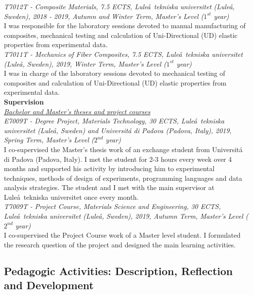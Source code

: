 \documentclass[
  a4paper, 
]{fortysecondscv}
\begin{document}
\textit{T7012T - Composite Materials, 7.5 ECTS, Lule\aa\ tekniska universitet (Lule\aa, Sweden), 2018 - 2019, Autumn and Winter Term, Master's Level ($1^{st}$ year)}\\
I was responsible for the laboratory sessions devoted to manual manufacturing of composites, mechanical testing and calculation of Uni-Directional (UD) elastic properties from experimental data.\\[6pt]
\textit{T7011T - Mechanics of Fiber Composites, 7.5 ECTS, Lule\aa\ tekniska universitet (Lule\aa, Sweden), 2019, Winter Term, Master's Level ($1^{st}$ year)}\\
I was in charge of the laboratory sessions devoted to mechanical testing of composites and calculation of Uni-Directional (UD) elastic properties from experimental data.\\[6pt]
\textbf{Supervision}\\[6pt]
\underline{\emph{Bachelor and Master's theses and project courses}}\\[6pt]
\textit{E7009T - Degree Project, Materials Technology, 30 ECTS, Lule\aa\ tekniska universitet (Lule\aa, Sweden) and Universit\'a di Padova (Padova, Italy), 2019, Spring Term, Master's Level ($2^{nd}$ year)}\\
I co-supervised the Master's thesis work of an exchange student from Universit\'a di Padova (Padova, Italy). I met the student for 2-3 hours every week over 4 months and supported his activity by introducing him to experimental techniques, methods of design of experiments, programming languages and data analysis strategies. The student and I met with the main supervisor at Lule\aa\ tekniska universitet once every month.\\[6pt]
\textit{T7009T - Project Course, Materials Science and Engineering, 30 ECTS, Lule\aa\ tekniska universitet (Lule\aa, Sweden), 2019, Autumn Term, Master's Level ($2^{nd}$ year)}\\
I co-supervised the Project Course work of a Master level student. I formulated the research question of the project and designed the main learning activities.\\

\newpage
\makebacksidebar
\hrulefill\hspace{5pt}\textbf{\thepage}

\subsection{Pedagogic Activities: Description, Reflection and Development}
\end{document}
